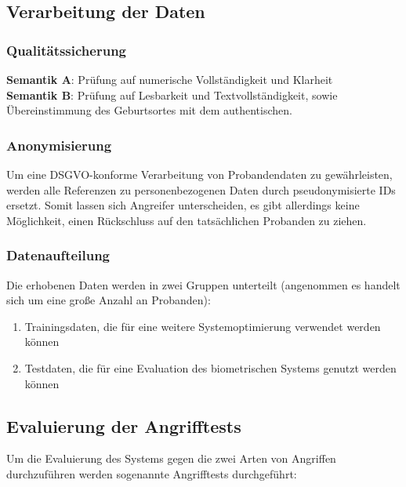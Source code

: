 \documentclass{article}
\begin{document}
\subsection{Verarbeitung der Daten}

\subsubsection{Qualitätssicherung}

\begin{flushleft}
	\textbf{Semantik A}: Prüfung auf numerische Vollständigkeit und Klarheit\\
	\textbf{Semantik B}: Prüfung auf Lesbarkeit und Textvollständigkeit, sowie Übereinstimmung des Geburtsortes mit dem authentischen.	
\end{flushleft}

\subsubsection{Anonymisierung}

Um eine DSGVO-konforme Verarbeitung von Probandendaten zu gewährleisten, werden alle Referenzen zu 
personenbezogenen Daten durch pseudonymisierte IDs ersetzt. Somit lassen sich Angreifer unterscheiden, es 
gibt allerdings keine Möglichkeit, einen Rückschluss auf den tatsächlichen Probanden zu ziehen.

\subsubsection{Datenaufteilung}

Die erhobenen Daten werden in zwei Gruppen unterteilt (angenommen es handelt sich um eine große Anzahl an Probanden):

\begin{enumerate}
	\item Trainingsdaten, die für eine weitere Systemoptimierung verwendet werden können
	\item Testdaten, die für eine Evaluation des biometrischen Systems genutzt werden können
\end{enumerate}

\subsection{Evaluierung der Angrifftests}

Um die Evaluierung des Systems gegen die zwei Arten von Angriffen durchzuführen werden sogenannte Angrifftests durchgeführt:
\end{document}
